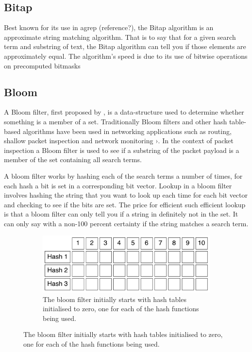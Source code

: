 \documentclass{article}
\begin{document}
\subsection{Bitap}

Best known for its use in agrep (reference?), the Bitap algorithm \cite{Baeza1992} is an approximate string matching algorithm. That is to say that for a given search term and substring of text, the Bitap algorithm can tell you if those elements are approximately equal. The algorithm's speed is due to its use of bitwise operations on precomputed bitmasks 

\subsection{Bloom}

A Bloom filter, first proposed by \cite{Bloom1970}, is a data-structure used to determine whether something is a member of a set. Traditionally Bloom filters and other hash table-based algorithms have been used in networking applications such as routing, shallow packet inspection and network monitoring \citep{Song2005}›. In the context of packet inspection a Bloom filter is used to see if a substring of the packet payload is a member of the set containing all search terms.

A bloom filter works by hashing each of the search terms a number of times, for each hash a bit is set in a corresponding bit vector. Lookup in a bloom filter involves hashing the string that you want to look up each time for each bit vector and checking to see if the bits are set. The price for efficient such efficient lookup is that a bloom filter can only tell you if a string in definitely not in the set. It can only say with a non-100 percent certainty if the string matches a search term.

\begin{figure}[h!bt]
  \label{bloom-1}
  \centering
  
  \begin{subfigure}{\textwidth}
  \makeatletter
  \includegraphics[width=\textwidth]{images/bloom-1}
  \caption{The bloom filter initially starts with hash tables initialised to zero, one for each of the hash functions being used.}
  \end{subfigure}
\end{figure} 
\end{document}
